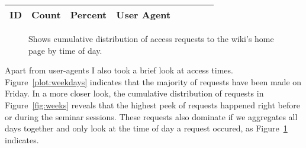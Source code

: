 \documentclass[twocolumn, a4paper, 10pt]{article}
\begin{document}
\begin{table*}
\centering
\small
\begin{tabular}{lllp{0.7\linewidth}}
	ID & Count & Percent & User Agent\\
	\hline
	
\end{tabular}
\caption{Detailed listing of all user-agent strings found (every request counted). All Browsers identify as Mozilla 5.0. The vast majority of students use the same web browser (a recent Tor Browser Bundle). There are however a few older versions and a few exotic exceptions. Noteworthy are IDs 7 and 2,3,4, which leak the browsers' language preference.}
\label{table:user_agents}
\end{table*}


\begin{figure*}
	\hfill
		\begin{minipage}{0.49\textwidth}
			
		\end{minipage}
	\hfill
		\begin{minipage}{0.49\textwidth}
			
		\end{minipage}
	\hfill
	
	\caption{Access on the wiki for each week by week day, divided by 12h ticks and starting at Monday 00:00. About half of the requests happened on Friday, starting a bit before noon, and continuing through the afternoon, however stopping before 18:00.}
	\label{fig:weeks}
\end{figure*}

\begin{figure}
	
	\caption{Shows cumulative distribution of access requests to the wiki's home page by time of day.}
	\label{fig:days}
\end{figure}


Apart from user-agents I also took a brief look at access times. Figure~\ref{plot:weekdays} indicates that the majority of requests have been made on Friday. In a more closer look, the cumulative distribution of requests in Figure~\ref{fig:weeks} reveals that the highest peek of requests happened right before or during the seminar sessions. These requests also dominate if we aggregates all days together and only look at the time of day a request occured, as Figure~\ref{fig:days} indicates.


{
	
	
}

\appendix
\end{document}
